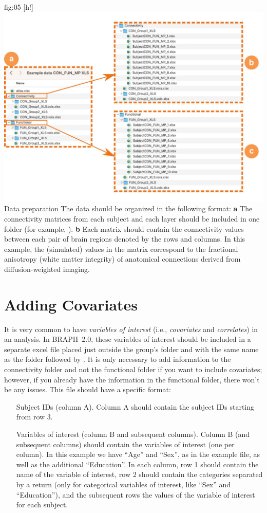 \documentclass[justified]{tufte-handout}
\begin{document}
	{fig:05}
	{
	[h!]
	\includegraphics{fig05.jpg}
	}
	{Data preparation}
	{
	The data should be organized in the following format:
	{\bf a} The connectivity matrices from each subject and each layer should be included in one folder (for example, ). 
	{\bf b} Each matrix should contain the connectivity values between each pair of brain regions denoted by the rows and columns. In this example, the (simulated) values in the matrix correspond to the fractional anisotropy (white matter integrity) of anatomical connections derived from diffusion-weighted imaging.
	} 

\section{Adding Covariates}
	
It is very common to have \emph{variables of interest} (i.e., \emph{covariates} and \emph{correlates}) in an analysis. In BRAPH~2.0, these variables of interest should be included in a separate excel file placed just outside the group's folder and with the same name as the folder followed by . It is only necessary to add information to the connectivity folder and not the functional folder if you want to include covariates; however, if you already have the information in the functional folder, there won’t be any issues.
This file should have a specific format:
\begin{itemize}

\item[Subject IDs (column A).]
Column A should contain the subject IDs starting from row 3.

\item[Variables of interest (column B and subsequent columns).]
Column B (and subsequent columns) should contain the variables of interest (one per column). 
In this example we have ``Age'' and ``Sex'', as in the example file, as well as the additional ``Education''.
In each column, row 1 should contain the name of the variable of interest, row 2 should contain the categories separated by a return (only for categorical variables of interest, like ``Sex'' and ``Education''), and the subsequent rows the values of the variable of interest for each subject.

\end{itemize}	
\end{document}
